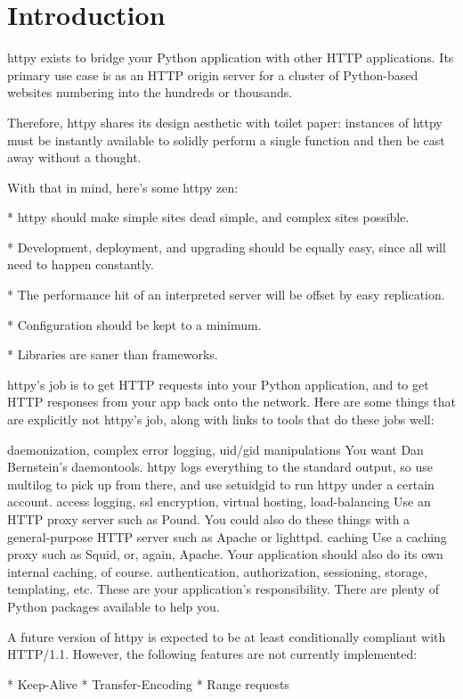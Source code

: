 \chapter{Introduction}

httpy exists to bridge your Python application with other HTTP applications. Its
primary use case is as an HTTP origin server for a cluster of Python-based
websites numbering into the hundreds or thousands.

Therefore, httpy shares its design aesthetic with toilet paper: instances of
httpy must be instantly available to solidly perform a single function and then
be cast away without a thought.

With that in mind, here's some httpy zen:

    * httpy should make simple sites dead simple, and complex sites possible.

    * Development, deployment, and upgrading should be equally easy, since all will need to happen constantly.

    * The performance hit of an interpreted server will be offset by easy replication.

    * Configuration should be kept to a minimum.

    * Libraries are saner than frameworks.

httpy's job is to get HTTP requests into your Python application, and to get HTTP responses from your app back onto the network. Here are some things that are explicitly not httpy's job, along with links to tools that do these jobs well:

daemonization,
complex error logging,
uid/gid manipulations
    You want Dan Bernstein's daemontools. httpy logs everything to the standard output, so use multilog to pick up from there, and use setuidgid to run httpy under a certain account.
access logging,
ssl encryption,
virtual hosting,
load-balancing
    Use an HTTP proxy server such as Pound. You could also do these things with a general-purpose HTTP server such as Apache or lighttpd.
caching
    Use a caching proxy such as Squid, or, again, Apache. Your application should also do its own internal caching, of course.
authentication,
authorization,
sessioning,
storage,
templating,
etc.
    These are your application's responsibility. There are plenty of Python packages available to help you.

A future version of httpy is expected to be at least conditionally compliant with HTTP/1.1. However, the following features are not currently implemented:

    * Keep-Alive
    * Transfer-Encoding
    * Range requests
